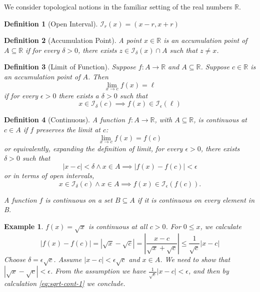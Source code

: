 \documentclass{article}
\newtheorem{definition}{Definition}%
\newtheorem{example}{Example}%
\newcommand{\Reals}[0]{\mathbb{R}}
\begin{document}
We consider topological notions in the familiar setting of the real
numbers $\Reals$.

\begin{definition}[Open Interval]
  $\mathcal{I}_r(x) = (x-r,x+r)$
\end{definition}

\begin{definition}[Accumulation Point]
  A point $x \in \Reals$ is an accumulation point of $A \subseteq
  \Reals$ if for every $\delta > 0$, there exists $z \in
  \mathcal{I}_\delta(x) \cap A$ such that $z \neq x$.
\end{definition}


\begin{definition}[Limit of Function]
  Suppose $f : A \to \Reals$ and $A \subseteq \Reals$.
  Suppose $c \in \Reals$ is an accumulation point of $A$.
  Then
  \[
   \lim_{x\to c} f(x) = \ell
  \]
  if for every $\epsilon > 0$ there exists a $\delta > 0$
  such that
  \[
  x \in \mathcal{I}_\delta(c) \implies f(x) \in \mathcal{I}_\epsilon(\ell)
  \]
\end{definition}

\begin{definition}[Continuous]
  A function $f : A \to \Reals$, with $A \subseteq \Reals$,
  is continuous at $c \in A$ if $f$ preserves the limit at $c$:
  \[
    \lim_{x\to c} f(x) = f(c)
  \]
  or equivalently, expanding the definition of limit, for every
  $\epsilon > 0$, there exists $\delta > 0$ such that
  \[
    |x - c| < \delta \land x \in A \implies |f(x) - f(c)| < \epsilon
  \]
  or in terms of open intervals,
  \[
    x \in \mathcal{I}_\delta(c) \land x \in A \implies f(x) \in \mathcal{I}_\epsilon(f(c)).
  \]

  A function $f$ is continuous on a set $B \subseteq A$ if it is
  continuous on every element in B.
\end{definition}

\begin{example}
$f(x) = \sqrt x$ is continuous at all $c > 0$. 
For $0 \leq x$, we calculate
\begin{equation}\label{eq:sqrt-cont-1}
   |f(x) - f(c)| = |\sqrt x - \sqrt c| 
    = \left| \frac{x - c}{\sqrt x + \sqrt c} \right|
    \leq \frac{1}{\sqrt c} |x - c|
\end{equation}
Choose $\delta = \epsilon \sqrt c$. Assume $|x - c| < \epsilon \sqrt c$
and $x \in A$. We need to show that $|\sqrt x - \sqrt c| < \epsilon$.
From the assumption we have $\frac{1}{\sqrt c}|x - c| < \epsilon$,
and then by calculation \eqref{eq:sqrt-cont-1} we conclude.
\end{example}
\end{document}

